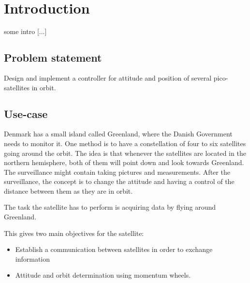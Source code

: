 \chapter{Introduction}\label{chap:Introduction}
%
\cite{Biezl}
some intro [...]

%
\section{Problem statement}
%
Design and implement a controller for attitude and position of several pico-satellites in orbit.
%
\section{Use-case}\label{sec:useCase}
%
Denmark has a small island called Greenland, where the Danish Government needs to monitor it.
One method is to have a constellation of four to six satellites going around the orbit. The idea is that whenever the satellites are located in the northern hemisphere, both of them will point down and look towards Greenland. The surveillance might contain taking pictures and measurements. After the surveillance, the concept is to change the attitude and having a control of the distance between them as they are in orbit.

The task the satellite has to perform is acquiring data by flying around Greenland.

This gives two main objectives for the satellite: 
\vspace{-0.5cm}
\begin{itemize}
	\item Establish a communication between satellites in order to exchange information
	\item Attitude and orbit determination using momentum wheels.
\end{itemize}
%